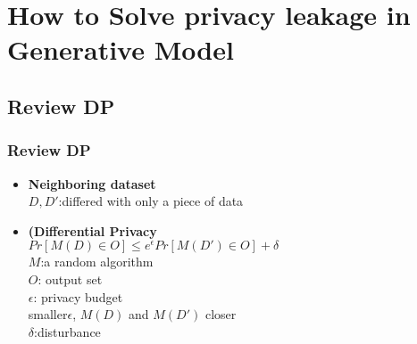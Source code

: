 \documentclass{beamer}
\begin{document}

\section{How to Solve privacy leakage in Generative Model}
\subsection{Review DP}
\begin{frame}
\frametitle{Review DP}
    \begin{itemize}
        \item \textbf{Neighboring dataset}\\[5pt]
        $D, D'$:differed with only a piece of data\\[20pt]
        \item \textbf{(Differential Privacy}\\[5pt]
        $Pr[M(D) \in O] \leq e^{\epsilon}Pr[M(D') \in O] + \delta$\\[5pt]
        $M$:a random algorithm\\
        $O$: output set\\
        $\epsilon$: privacy budget\\
        \quad smaller$\epsilon$, $M(D)$ and $M(D')$ closer\\
        $\delta$:disturbance\\
    \end{itemize}
\end{frame}
    
    
\end{document}
